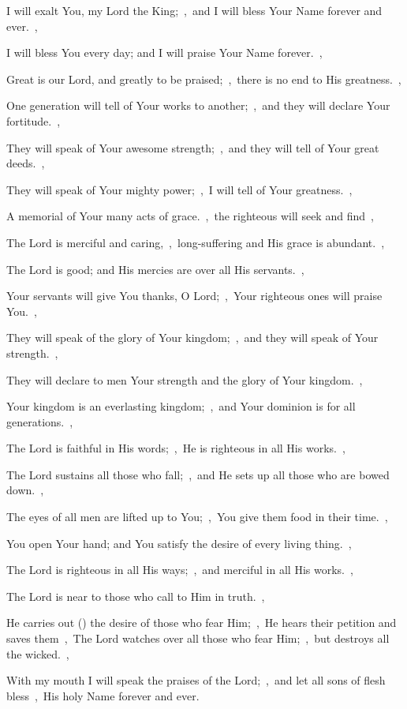 \documentclass[12pt,twoside,a5paper]{article}
\begin{document}


\begin{normalparskip}
  I will exalt You, my Lord the King;~\sep\ and I will bless Your Name forever and ever.~\sep


  I will bless You every day; and I will praise Your Name forever.~\sep

  Great is our Lord, and greatly to be praised;~\sep\ there is no end to His greatness.~\sep

  One generation will tell of Your works to another;~\sep\ and they will declare Your fortitude.~\sep

  They will speak of Your awesome strength;~\sep\ and they will tell of Your great deeds.~\sep

  They will speak of Your mighty power;~\sep\ I will tell of Your greatness.~\sep

  A memorial of Your many acts of grace.~\sep\ the righteous will seek and find~\sep

  The Lord is merciful and caring,~\sep\ long-suffering and His grace is abundant.~\sep

  The Lord is good; and His mercies are over all His servants.~\sep

  Your servants will give You thanks, O Lord;~\sep\ Your righteous ones will praise You.~\sep

  They will speak of the glory of Your kingdom;~\sep\ and they will speak of Your strength.~\sep

  They will declare to men Your strength and the glory of Your kingdom.~\sep

  Your kingdom is an everlasting kingdom;~\sep\ and Your dominion is for all generations.~\sep

  The Lord is faithful in His words;~\sep\ He is righteous in all His works.~\sep

  The Lord sustains all those who fall;~\sep\ and He sets up all those who are bowed down.~\sep

  The eyes of all men are lifted up to You;~\sep\ You give them food in their time.~\sep

  You open Your hand; and You satisfy the desire of every living thing.~\sep

  The Lord is righteous in all His ways;~\sep\ and merciful in all His works.~\sep

  The Lord is near to those who call to Him in truth.~\sep

  He carries out () the desire of those who fear Him;~\sep\ He hears their petition and saves them~\sep\ The Lord watches over all those who fear Him;~\sep\ but destroys all the wicked.~\sep

  With my mouth I will speak the praises of the Lord;~\sep\ and let all sons of flesh bless~\sep\ His holy Name forever and ever.
\end{normalparskip}
\end{document}

